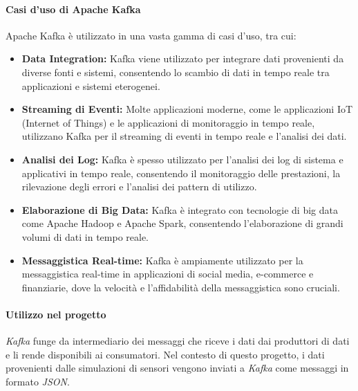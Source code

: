 \paragraph{Casi d'uso di Apache Kafka}

Apache Kafka è utilizzato in una vasta gamma di casi d'uso, tra cui:

\begin{itemize}
  \item \textbf{Data Integration:} Kafka viene utilizzato per integrare dati provenienti da diverse fonti e sistemi, consentendo lo scambio di dati in tempo reale tra applicazioni e sistemi eterogenei.
  
  \item \textbf{Streaming di Eventi:} Molte applicazioni moderne, come le applicazioni IoT (Internet of Things) e le applicazioni di monitoraggio in tempo reale, utilizzano Kafka per il streaming di eventi in tempo reale e l'analisi dei dati.
  
  \item \textbf{Analisi dei Log:} Kafka è spesso utilizzato per l'analisi dei log di sistema e applicativi in tempo reale, consentendo il monitoraggio delle prestazioni, la rilevazione degli errori e l'analisi dei pattern di utilizzo.
  
  \item \textbf{Elaborazione di Big Data:} Kafka è integrato con tecnologie di big data come Apache Hadoop e Apache Spark, consentendo l'elaborazione di grandi volumi di dati in tempo reale.
  
  \item \textbf{Messaggistica Real-time:} Kafka è ampiamente utilizzato per la messaggistica real-time in applicazioni di social media, e-commerce e finanziarie, dove la velocità e l'affidabilità della messaggistica sono cruciali.
\end{itemize}

\paragraph{Utilizzo nel progetto}
\textit{Kafka} funge da intermediario dei messaggi che riceve i dati dai produttori di dati e li rende disponibili ai consumatori. Nel contesto di questo progetto, i dati provenienti dalle simulazioni di sensori vengono inviati a \textit{Kafka} come messaggi in formato \textit{JSON}.

